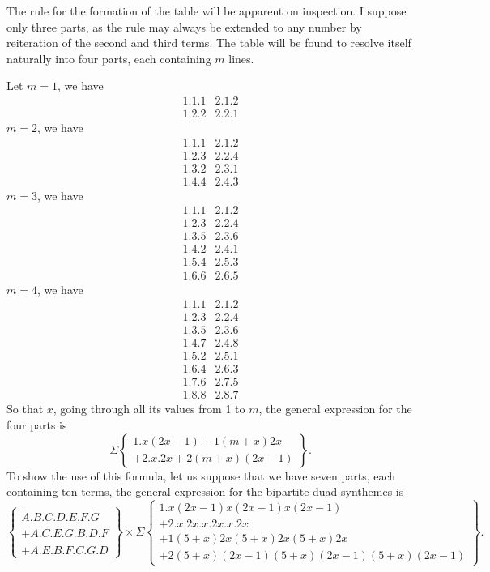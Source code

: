 \documentclass[11pt]{article}
\newcommand{\sourcepage}[1]{\marginpar{\scriptsize p.~#1}}
\newcommand{\dotter}[1]{\dot{#1}}
\begin{document}
{{\sourcepage{100}
The rule for the formation of the table will be apparent on inspection. I suppose only three parts, as the rule may always be extended to any number by reiteration of the second and third terms. The table will be found to resolve itself naturally into four parts, each containing $m$ lines.

Let $m=1$, we have
\[
\begin{array}{cc}
1.1.1&2.1.2\\
1.2.2&2.2.1
\end{array}
\]
$m=2$, we have
\[
\begin{array}{cc}
1.1.1&2.1.2\\
1.2.3&2.2.4\\
1.3.2&2.3.1\\
1.4.4&2.4.3
\end{array}
\]
$m=3$, we have
\[
\begin{array}{cc}
1.1.1&2.1.2\\
1.2.3&2.2.4\\
1.3.5&2.3.6\\
1.4.2&2.4.1\\
1.5.4&2.5.3\\
1.6.6&2.6.5
\end{array}
\]
$m=4$, we have
\[
\begin{array}{cc}
1.1.1&2.1.2\\
1.2.3&2.2.4\\
1.3.5&2.3.6\\
1.4.7&2.4.8\\
1.5.2&2.5.1\\
1.6.4&2.6.3\\
1.7.6&2.7.5\\
1.8.8&2.8.7
\end{array}
\]
So that $x$, going through all its values from 1 to $m$, the general expression for the four parts is
\[
\Sigma\left\{\begin{array}{l}
1.x(2x-1)+1(m+x)2x\\
+2.x.2x+2(m+x)(2x-1)
\end{array}\right\}.
\]
To show the use of this formula, let us suppose that we have seven parts, each containing ten terms, the general expression for the bipartite duad synthemes is
\[
\left\{\begin{array}{l}
\dotter A.B.C.D.E.F.\dotter G\\
+\dotter A.C.E.G.B.D.\dotter F\\
+\dotter A.E.B.F.C.G.\dotter D
\end{array}\right\}
\times \Sigma
\left\{\begin{array}{l}
1.x(2x-1)x(2x-1)x(2x-1)\\
+2.x.2x.x.2x.x.2x\\
+1(5+x)2x(5+x)2x(5+x)2x\\
+2(5+x)(2x-1)(5+x)(2x-1)(5+x)(2x-1)
\end{array}\right\}.
\]

}}
\end{document}
